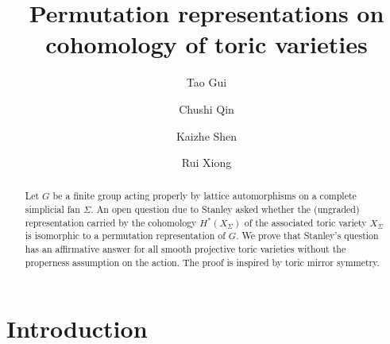 \documentclass[12pt]{amsart}
\theoremstyle{remark}
\begin{document}
\title{Permutation representations on cohomology of toric varieties}

\author{Tao Gui}
\address{(Tao Gui) \newline \indent Institute for Theoretical Sciences, Westlake University, No.\ 600 Dunyu Road, Xihu District, Hangzhou, Zhejiang Province 310030, China}

\author{Chushi Qin}
\address{(Chushi Qin)\newline \indent Institute for Interdisciplinary
Information Sciences, Tsinghua University, Beijing 100084, China}

\author{Kaizhe Shen}
\address{(Kaizhe Shen)\newline \indent Department of Mathematics, 1291 University of Oregon, 175 Prince Lucien Campbell Hall, Eugene, OR 97403-1205}

\author{Rui Xiong}
\address{(Rui Xiong)\newline \indent Department of Mathematics, University of Michigan, Ann Arbor, MI 48109}



\begin{abstract}
Let $G$ be a finite group acting properly by lattice automorphisms on a complete simplicial fan $\Sigma$. An open question due to Stanley asked whether the (ungraded) representation carried by the cohomology $H^*(X_{\Sigma})$ of the associated toric variety $X_{\Sigma}$ is isomorphic to a  permutation representation of $G$. We prove that Stanley's question has an affirmative answer for all smooth projective toric varieties without the properness assumption on the action. 
The proof is inspired by toric mirror symmetry.
\end{abstract}

\maketitle

\section{Introduction}
\end{document}
